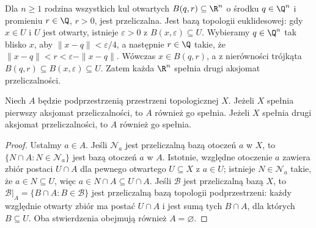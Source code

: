 \begin{przyklad}
\label{ex:topog-przeliczalna-baza-euklidesowa}
Dla $n\geq1$ rodzina wszystkich kul otwartych
$B(q,r)\subseteq\R^n$ o środku $q\in\Q^n$
i promieniu $r\in\Q$, $r>0$, jest przeliczalna.
Jest bazą topologii euklidesowej: gdy $x\in U$ i $U$ jest otwarty,
istnieje $\varepsilon>0$ z $B(x,\varepsilon)\subseteq U$.
Wybieramy $q\in\Q^n$ tak blisko $x$, aby
$\|x-q\|<\varepsilon/4$, a następnie
$r\in\Q$ takie, że
$\|x-q\|<r<\varepsilon-\|x-q\|$.
Wówczas $x\in B(q,r)$, a z nierówności trójkąta
$B(q,r)\subseteq B(x,\varepsilon)\subseteq U$.
Zatem każda $\R^n$ spełnia drugi aksjomat przeliczalności.
\end{przyklad}

\begin{twierdzenie}
\label{thm:topog-przeliczalnosc-dziedziczenie}
Niech $A$ będzie podprzestrzenią przestrzeni topologicznej $X$.
Jeżeli $X$ spełnia pierwszy aksjomat przeliczalności, to $A$
również go spełnia. Jeżeli $X$ spełnia drugi aksjomat
przeliczalności, to $A$ również go spełnia.
\end{twierdzenie}
\begin{proof}
Ustalmy $a\in A$. Jeśli $\mathcal N_a$ jest przeliczalną
bazą otoczeń $a$ w $X$, to
$\{N\cap A:N\in\mathcal N_a\}$
jest bazą otoczeń $a$ w $A$. Istotnie, względne otoczenie
$a$ zawiera zbiór postaci $U\cap A$ dla pewnego otwartego
$U\subseteq X$ z $a\in U$; istnieje $N\in\mathcal N_a$
takie, że $a\in N\subseteq U$, więc
$a\in N\cap A\subseteq U\cap A$.
Jeśli $\mathcal B$ jest przeliczalną bazą $X$, to
$\mathcal B|_A=\{B\cap A:B\in\mathcal B\}$
jest przeliczalną bazą topologii podprzestrzeni:
każdy względnie otwarty zbiór ma postać $U\cap A$ i jest
sumą tych $B\cap A$, dla których $B\subseteq U$.
Oba stwierdzenia obejmują również $A=\varnothing$.
\end{proof}

